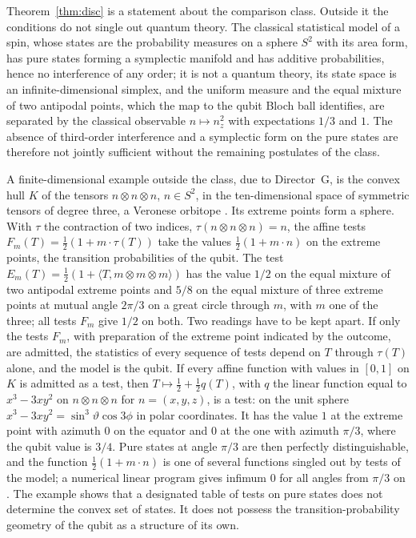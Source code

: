 Theorem~\ref{thm:disc} is a statement about the comparison class. Outside it the conditions do not single out quantum theory. The classical statistical model of a spin, whose states are the probability measures on a sphere $S^2$ with its area form, has pure states forming a symplectic manifold and has additive probabilities, hence no interference of any order; it is not a quantum theory, its state space is an infinite-dimensional simplex, and the uniform measure and the equal mixture of two antipodal points, which the map to the qubit Bloch ball identifies, are separated by the classical observable $n\mapsto n_z^2$ with expectations $1/3$ and $1$. The absence of third-order interference and a symplectic form on the pure states are therefore not jointly sufficient without the remaining postulates of the class.

A finite-dimensional example outside the class, due to Director~G, is the convex hull $K$ of the tensors $n\otimes n\otimes n$, $n\in S^2$, in the ten-dimensional space of symmetric tensors of degree three, a Veronese orbitope \cite{orbitopes}. Its extreme points form a sphere. With $\tau$ the contraction of two indices, $\tau(n\otimes n\otimes n)=n$, the affine tests $F_m(T)=\tfrac12(1+m\cdot\tau(T))$ take the values $\tfrac12(1+m\cdot n)$ on the extreme points, the transition probabilities of the qubit. The test $E_m(T)=\tfrac12(1+\langle T,m\otimes m\otimes m\rangle)$ has the value $1/2$ on the equal mixture of two antipodal extreme points and $5/8$ on the equal mixture of three extreme points at mutual angle $2\pi/3$ on a great circle through $m$, with $m$ one of the three; all tests $F_m$ give $1/2$ on both. Two readings have to be kept apart. If only the tests $F_m$, with preparation of the extreme point indicated by the outcome, are admitted, the statistics of every sequence of tests depend on $T$ through $\tau(T)$ alone, and the model is the qubit. If every affine function with values in $[0,1]$ on $K$ is admitted as a test, then $T\mapsto\tfrac12+\tfrac12q(T)$, with $q$ the linear function equal to $x^3-3xy^2$ on $n\otimes n\otimes n$ for $n=(x,y,z)$, is a test: on the unit sphere $x^3-3xy^2=\sin^3\vartheta\cos3\phi$ in polar coordinates. It has the value $1$ at the extreme point with azimuth $0$ on the equator and $0$ at the one with azimuth $\pi/3$, where the qubit value is $3/4$. Pure states at angle $\pi/3$ are then perfectly distinguishable, and the function $\tfrac12(1+m\cdot n)$ is one of several functions singled out by tests of the model; a numerical linear program gives infimum $0$ for all angles from $\pi/3$ on \cite{comp3}. The example shows that a designated table of tests on pure states does not determine the convex set of states. It does not possess the transition-probability geometry of the qubit as a structure of its own.


